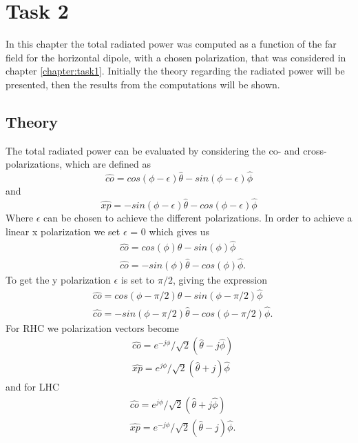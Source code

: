 \chapter{Task 2}
\label{chapter:task2}
In this chapter the total radiated power was computed as a function of the far field for the horizontal dipole, with a chosen polarization, that was considered in chapter \ref{chapter:task1}. Initially the theory regarding the radiated power will be presented, then the results from the computations will be shown. 

\section{Theory}
The total radiated power can be evaluated by considering the co- and cross-polarizations, which are defined as 
\begin{equation}
\hat{co} = cos(\phi - \epsilon) \hat{\theta} - sin(\phi - \epsilon)\hat{\phi}
\end{equation} 
and
\begin{equation}
\hat{xp} = -sin(\phi - \epsilon) \hat{\theta} - cos(\phi - \epsilon)\hat{\phi}
\end{equation}
Where $\epsilon$ can be chosen to achieve the different polarizations. In order to achieve a linear  x polarization we set $\epsilon$ = 0 which gives us 
\begin{align}
&\hat{co} = cos(\phi)\hat{\theta} - sin(\phi)\hat{\phi} \\
&\hat{co} = -sin(\phi)\hat{\theta} - cos(\phi)\hat{\phi}.
\end{align}
To get the y polarization $\epsilon$ is set to $\pi/2$, giving the expression 
\begin{align}
&\hat{co} = cos(\phi-\pi/2)\hat{\theta} - sin(\phi-\pi/2)\hat{\phi} \\
&\hat{co} = -sin(\phi-\pi/2)\hat{\theta} - cos(\phi-\pi/2)\hat{\phi}.
\end{align}
For RHC we polarization vectors become  
\begin{align}
&\hat{co} = e^{-j\phi}/\sqrt{2}(\hat{\theta} - j\hat{\phi}) \\
&\hat{xp} = e^{j\phi}/\sqrt{2}(\hat{\theta} + j)\hat{\phi}
\end{align}
and for LHC
\begin{align}
&\hat{co} = e^{j\phi}/\sqrt{2}(\hat{\theta} + j\hat{\phi}) \\
&\hat{xp} = e^{-j\phi}/\sqrt{2}(\hat{\theta} - j)\hat{\phi}.
\end{align}
